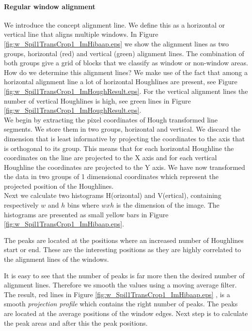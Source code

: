 \paragraph{Regular window alignment}
We introduce the concept alignment line. We define this as a horizontal or
vertical line that aligns multiple windows. In Figure
\ref{fig:w_Spil1TransCrop1_ImHibaap.eps}
we show the alignment lines as two groups, horizontal (red) and
vertical (green) alignment lines.  The combination of both groups give a grid of
blocks that we classify as window or non-window areas.\\

How do we determine this alignment lines? We make use of the fact that among a
horizontal alignment line a lot of horizontal Houghlines are present, see
Figure \ref{fig:w_Spil1TransCrop1_ImHoughResult.eps}. For the vertical alignment lines
the number of vertical Houghlines is high, see green lines in Figure
\ref{fig:w_Spil1TransCrop1_ImHoughResult.eps}.\\

We begin by extracting the pixel coordinates of Hough transformed line
segments. We store them in two groups, horizontal and vertical.%
We discard the dimension that is least informative by projecting the coordinates to
the axis that is orthogonal to its group. 
This means that for each horizontal Houghline the coordinates on the line are projected to the X
axis and for each vertical Houghline the coordinates are projected to the Y
axis. We have now transformed the data in two groups of 1 dimensional
coordinates which represent the projected position of the Houghlines.\\

Next we calculate two histograms H(orizontal) and V(ertical), containing respectively
$w$ and $h$ bins where $w x h$ is the dimension of the image.  The histograms
are presented as small yellow bars in Figure \ref{fig:w_Spil1TransCrop1_ImHibaap.eps}.

The peaks are located at the positions where an increased number of Houghlines
start or end.  These are the interesting positions as they are highly correlated
to the alignment lines of the windows. 

It is easy to see that the number of peaks is far more then the desired number of alignment lines.
Therefore we smooth the values using a moving average filter.
The result, red lines in Figure \ref{fig:w_Spil1TransCrop1_ImHibaap.eps}
, is a smooth \emph{projection profile} which contains the right number of peaks. The peaks
are located at the average positions of the window edges. Next step is to
calculate the peak areas and after this the peak positions. 

